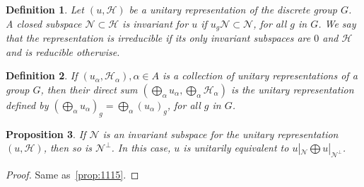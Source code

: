 \documentclass{book}
\newtheorem{definition}{Definition}[section]
\newtheorem{proposition}[definition]{Proposition}
\begin{document}
\begin{definition}
  Let \((u,\mathcal{H})\) be a unitary representation of the discrete group
  \(G\). A closed subspace \(\mathcal{N} \subset \mathcal{H}\) is \textnormal{invariant} for \(u\) if \(u_g\mathcal{N} \subset \mathcal{N}\), 
  for all \(g\) in \(G\).
  We say that the representation is \textnormal{irreducible} if its only invariant subspaces
  are \(0\) and \(\mathcal{H}\) and is \textnormal{reducible} otherwise.
\end{definition}
\begin{definition}
  If \((u_\alpha,\mathcal{H}_\alpha),\alpha \in A\) is a collection of unitary 
  representations of a group \(G\), then their direct sum \((\bigoplus_{\alpha}u_\alpha,\bigoplus_\alpha \mathcal{H}_\alpha)\) 
  is the unitary representation defined by \({(\bigoplus_\alpha u_\alpha)}_g = \bigoplus_\alpha{(u_\alpha)}_g\), for all \(g\) in \(G\).
\end{definition}
\begin{proposition}
  If \(\mathcal{N}\) is an invariant subspace for the unitary 
  representation \((u,\mathcal{H})\), then so is \(\mathcal{N}^\perp\). In this case, \(u\) is unitarily equivalent to
  \(u|_\mathcal{N} \bigoplus u|_{\mathcal{N}^\perp}\).
\end{proposition}
\begin{proof}
  Same as~\ref{prop:1115}.
\end{proof}   
\end{document}
